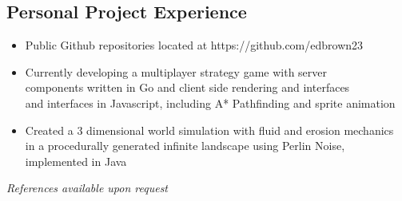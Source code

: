 \documentclass[line,margin]{res}
\begin{document}
\begin{resume}
    \section{Personal Project Experience}
        \begin{itemize} \itemsep -2pt
            \item Public Github repositories located at https://github.com/edbrown23 
            \item Currently developing a multiplayer strategy game with server \\
                  components written in Go and client side rendering and interfaces \\
                  and interfaces in Javascript, including A* Pathfinding and sprite animation
            \item Created a 3 dimensional world simulation with fluid and erosion mechanics \\
                  in a procedurally generated infinite landscape using Perlin Noise, \\
                  implemented in Java
        \end{itemize}
            
    {\sl References available upon request}
    \end{resume}
\end{document}
